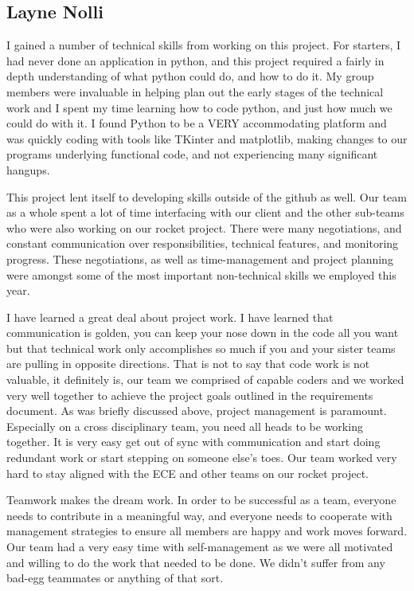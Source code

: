 \documentclass[10pt,draftclsnofoot,onecolumn,retainorgcmds]{IEEEtran}
\begin{document}
\subsection{Layne Nolli}
I gained a number of technical skills from working on this project. For starters, I had never  done an application in python, and this project required a fairly in depth understanding of what python could do, and how to do it. My group members were invaluable in helping plan out the early stages of the technical work and I spent my time learning how to code python, and just how much we could do with it. I found Python to be a VERY accommodating platform and was quickly coding with tools like TKinter and matplotlib, making changes to our programs underlying functional code, and not experiencing many significant hangups. \par
This project lent itself to developing skills outside of the github as well. Our team as a whole spent a lot of time interfacing with our client and the other sub-teams who were also working on our rocket project. There were many negotiations, and constant communication over responsibilities, technical features, and monitoring progress. These negotiations, as well as time-management and project planning were amongst some of the most important non-technical skills we employed this year.\par
I have learned a great deal about project work. I have learned that communication is golden, you can keep your nose down in the code all you want but that technical work only accomplishes so much if you and your sister teams are pulling in opposite directions. That is not to say that code work is not valuable, it definitely is, our team we comprised of capable coders and we worked very well together to achieve the project goals outlined in the requirements document.
As was briefly discussed above, project management is paramount. Especially on a cross disciplinary team, you need all heads to be working together. It is very easy get out of sync with communication and start doing redundant work or start stepping on someone else's toes. Our team worked very hard to stay aligned with the ECE and other teams on our rocket project. \par
Teamwork makes the dream work. In order to be successful as a team, everyone needs to contribute in a meaningful way, and everyone needs to cooperate with management strategies to ensure all members are happy and work moves forward. Our team had a very easy time with self-management as we were all motivated and willing to do the work that needed to be done. We didn't suffer from any bad-egg teammates or anything of that sort. \par
\end{document}
